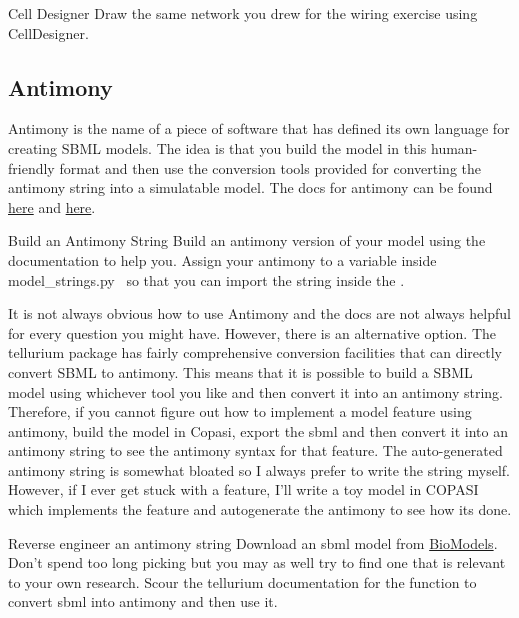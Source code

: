 \documentclass[../../main]{subfiles}
\begin{document}
    \begin{Task}[label=CellDesigner]{Cell Designer}
        Draw the same network you drew for the wiring exercise using CellDesigner.
    \end{Task}

    \subsection{Antimony}
    Antimony is the name of a piece of software that has defined its own language for creating SBML models.
    The idea is that you build the model in this human-friendly format and then use the conversion tools
    provided for converting the antimony string into a simulatable model. The docs for antimony can be
    found \href{https://tellurium.readthedocs.io/en/latest/antimony.html}{here} and \href{http://tellurium.analogmachine.org/antimony-tutorial/}{here}.

    \begin{Task}[label=AntimonyString]{Build an Antimony String}
        Build an antimony version of your model using the documentation to help you.
        Assign your antimony to a variable inside {model_strings.py~} so that you can import the
        string inside the .
    \end{Task}

    It is not always obvious how to use Antimony and the docs are not always helpful
    for every question you might have. However, there is an alternative option. The tellurium package
    has fairly comprehensive conversion facilities that can directly convert SBML to antimony. This means
    that it is possible to build a SBML model using whichever tool you like and then convert it into an
    antimony string. Therefore, if you cannot figure out how to implement a model feature using antimony,
    build the model in Copasi, export the sbml and then convert it into an antimony string to see
    the antimony syntax for that feature. The auto-generated antimony string is somewhat bloated
    so I always prefer to write the string myself. However, if I ever get stuck with a feature, I'll
    write a toy model in COPASI which implements the feature and autogenerate the antimony to see how its done.
    \begin{Task}[label=ReverseEnvineeringAntimony]{Reverse engineer an antimony string}
        Download an sbml model from \href{https://www.ebi.ac.uk/biomodels/}{BioModels}. Don't spend too long picking
        but you may as well try to find one that is relevant to your own research. Scour the tellurium documentation
        for the function to convert sbml into antimony and then use it.
    \end{Task}
\end{document}
